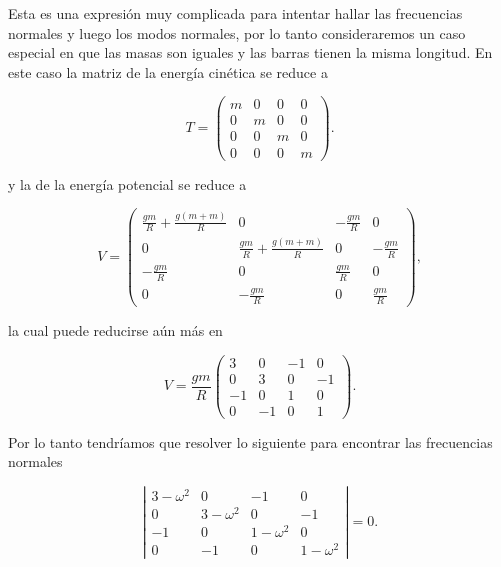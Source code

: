 \documentclass[a4paper,10pt]{article}
\numberwithin{equation}{section}
\begin{document}
Esta es una expresión muy complicada para intentar hallar las frecuencias normales 
y luego los modos normales, por lo tanto consideraremos un caso especial en que 
las masas son iguales y las barras tienen la misma longitud. En este caso la matriz 
de la energía cinética se reduce a 

\begin{equation}
 T = \begin{pmatrix}
      m & 0 & 0 & 0 \\
      0 & m & 0 & 0 \\
      0 & 0 & m & 0 \\
      0 & 0 & 0 & m
     \end{pmatrix}.
\end{equation}

y la de la energía potencial se reduce a 

\begin{equation}
 V = \begin{pmatrix}
      \frac{gm}{R} + \frac{g(m + m)}{R} & 0 & - \frac{gm}{R} & 0 \\
      0 & \frac{gm}{R} + \frac{g(m + m)}{R}& 0 & - \frac{gm}{R} \\
      - \frac{gm}{R} & 0 & \frac{gm}{R} & 0 \\
      0 & - \frac{gm}{R} & 0 & \frac{gm}{R}
        \end{pmatrix},
\end{equation}

la cual puede reducirse aún más en 

\begin{equation}
 V = \frac{gm}{R}\begin{pmatrix}
      3 & 0 & - 1 & 0 \\
      0 & 3 & 0 & - 1 \\
      - 1 & 0 & 1 & 0 \\
      0 & - 1 & 0 & 1
        \end{pmatrix}.
\end{equation}

Por lo tanto tendríamos que resolver lo siguiente para encontrar las frecuencias 
normales


 \begin{equation}
 \left|\begin{matrix}
      3 - \omega^2 & 0 & - 1 & 0 \\
      0 & 3 - \omega^2 & 0 & - 1 \\
      - 1 & 0 & 1 - \omega^2 & 0 \\
      0 & - 1 & 0 & 1 - \omega^2
        \end{matrix}\right| = 0.
\end{equation}
\end{document}
